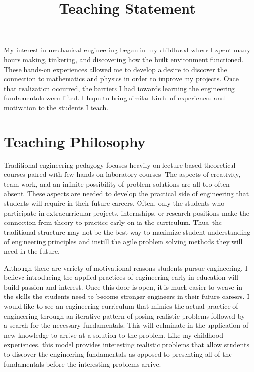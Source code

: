 \documentclass[titlepage]{article}
\title{Teaching Statement}
\date{}
\begin{document}
\maketitle

My interest in mechanical engineering began in my childhood where I spent many
hours making, tinkering, and discovering how the built environment functioned.
These hands-on experiences allowed me to develop a desire to discover the
connection to mathematics and physics in order to improve my projects. Once
that realization occurred, the barriers I had towards learning the engineering
fundamentals were lifted. I hope to bring similar kinds of experiences and
motivation to the students I teach.

\section*{Teaching Philosophy}
%
Traditional engineering pedagogy focuses heavily on lecture-based theoretical
courses paired with few hands-on laboratory courses. The aspects of creativity,
team work, and an infinite possibility of problem solutions are all too often
absent. These aspects are needed to develop the practical side of engineering
that students will require in their future careers. Often, only the students
who participate in extracurricular projects, internships, or research positions
make the connection from theory to practice early on in the curriculum. Thus,
the traditional structure may not be the best way to maximize student
understanding of engineering principles and instill the agile problem solving
methods they will need in the future.

Although there are variety of motivational reasons students pursue engineering,
I believe introducing the applied practices of engineering early in education
will build passion and interest. Once this door is open, it is much easier to
weave in the skills the students need to become stronger engineers in their
future careers. I would like to see an engineering curriculum that mimics the
actual practice of engineering through an iterative pattern of posing realistic
problems followed by a search for the necessary fundamentals. This will
culminate in the application of new knowledge to arrive at a solution to the
problem.  Like my childhood experiences, this model provides interesting
realistic problems that allow students to discover the engineering fundamentals
as opposed to presenting all of the fundamentals before the interesting
problems arrive.
\end{document}
